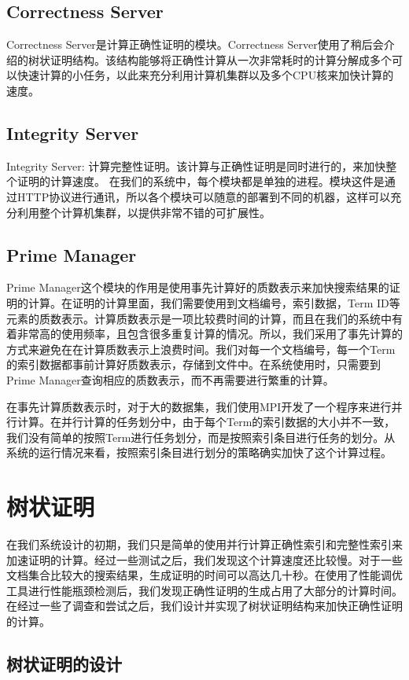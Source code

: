 \subsection{Correctness Server}
Correctness Server是计算正确性证明的模块。Correctness Server使用了稍后会介绍的树状证明结构。该结构能够将正确性计算从一次非常耗时的计算分解成多个可以快速计算的小任务，以此来充分利用计算机集群以及多个CPU核来加快计算的速度。

\subsection{Integrity Server}
Integrity Server: 计算完整性证明。该计算与正确性证明是同时进行的，来加快整个证明的计算速度。
在我们的系统中，每个模块都是单独的进程。模块这件是通过HTTP协议进行通讯，所以各个模块可以随意的部署到不同的机器，这样可以充分利用整个计算机集群，以提供非常不错的可扩展性。

\subsection{Prime Manager}
Prime Manager这个模块的作用是使用事先计算好的质数表示来加快搜索结果的证明的计算。在证明的计算里面，我们需要使用到文档编号，索引数据，Term ID等元素的质数表示。计算质数表示是一项比较费时间的计算，而且在我们的系统中有着非常高的使用频率，且包含很多重复计算的情况。所以，我们采用了事先计算的方式来避免在在计算质数表示上浪费时间。我们对每一个文档编号，每一个Term的索引数据都事前计算好质数表示，存储到文件中。在系统使用时，只需要到Prime Manager查询相应的质数表示，而不再需要进行繁重的计算。

在事先计算质数表示时，对于大的数据集，我们使用MPI开发了一个程序来进行并行计算。在并行计算的任务划分中，由于每个Term的索引数据的大小并不一致，我们没有简单的按照Term进行任务划分，而是按照索引条目进行任务的划分。从系统的运行情况来看，按照索引条目进行划分的策略确实加快了这个计算过程。

\section{树状证明}
在我们系统设计的初期，我们只是简单的使用并行计算正确性索引和完整性索引来加速证明的计算。经过一些测试之后，我们发现这个计算速度还比较慢。对于一些文档集合比较大的搜索结果，生成证明的时间可以高达几十秒。在使用了性能调优工具进行性能瓶颈检测后，我们发现正确性证明的生成占用了大部分的计算时间。在经过一些了调查和尝试之后，我们设计并实现了树状证明结构来加快正确性证明的计算。

\subsection{树状证明的设计}

